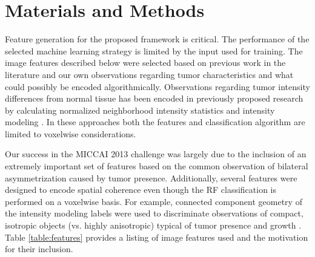 \documentclass[preprint,authoryear,review,12pt]{elsarticle}
\begin{document}


%
%

\section{Materials and Methods}

Feature generation for the proposed framework is critical.  The performance
of the selected machine learning strategy is limited by the input used for 
training. The image features described below were selected based on previous
work in the literature and our own observations regarding tumor characteristics
and what could possibly be encoded algorithmically.  Observations 
regarding tumor intensity differences from normal tissue has been encoded
in previously proposed research by calculating normalized neighborhood 
intensity statistics and intensity modeling \citep[e.g.,][]{bauer2011,bauer2012,geremia2012,zikic2012}.
In these approaches both the features and classification algorithm are limited to 
voxelwise considerations.  

Our success in the MICCAI 2013 challenge was largely due to the inclusion of
an extremely important set of features based on the common observation of
bilateral asymmetrization caused by tumor presence.  Additionally, several
features were designed to encode spatial coherence even though the RF classification
is performed on a voxelwise basis. For example, connected component geometry of the
intensity modeling labels were used to discriminate observations of compact,
isotropic objects (vs. highly anisotropic) typical of tumor presence and growth 
\citep{greenspan1972}.  Table \ref{table:features} provides a listing of image
features used and the motivation for their inclusion.  
\end{document}
